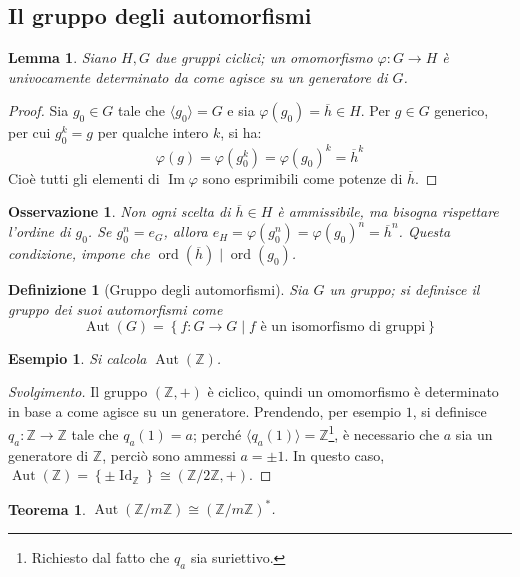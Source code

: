 \documentclass[11pt]{article}
\theoremstyle{style}
\newtheorem{esempio}{Esempio}[section]
\newtheorem{definizione}{Definizione}[section]
\newtheorem{teorema}{Teorema}[section]
\newtheorem{lemma}{Lemma}[teorema]
\newtheorem{osservazione}{Osservazione}[section]
\newenvironment{svolgimento}{\renewcommand\qedsymbol{$\blacksquare$}\begin{proof}[Svolgimento]}{\end{proof}}
\numberwithin{equation}{subsection}
\begin{document}
\subsection{Il gruppo degli automorfismi}
\begin{lemma}
	Siano $H,G$ due gruppi ciclici; un omomorfismo $\varphi : G \to H$ \`e univocamente determinato da come agisce su un generatore di $G$.
\end{lemma}
	\begin{proof}
		Sia $g_0\in G$ tale che $\langle g_0 \rangle = G$ e sia $\varphi (g_0) = \overline{h}\in H$.
		Per $g \in G$ generico, per cui $g_0^k = g$ per qualche intero $k$, si ha:
		\[
		\varphi (g) = \varphi (g_0^k) = \varphi (g_0)^k = \overline{h}^k
		\] 
		Cio\`e tutti gli elementi di $\operatorname{Im} \varphi $ sono esprimibili come potenze di $\overline{h}$.
	\end{proof}
\begin{osservazione}
Non ogni scelta di $\overline{h} \in H$ \`e ammissibile, ma bisogna rispettare l'ordine di $g_0$.
Se $g_0^n = e_G$, allora $e_H = \varphi (g_0^n) = \varphi (g_0)^n = \overline{h}^n$. Questa condizione, impone che $\operatorname{ord}(\overline{h})  \mid \operatorname{ord}(g_0) $.
\end{osservazione}
\begin{definizione}
	[Gruppo degli automorfismi]
	Sia $G$ un gruppo; si definisce il gruppo dei suoi automorfismi come
	\[
	\operatorname{Aut} (G) = \left\{ f: G \to G  \mid f \text{ \`e un isomorfismo di gruppi} \right\} 
	\] 
\end{definizione}
\begin{esempio}
	Si calcola $\operatorname{Aut} (\mathbb{Z})$. 
\end{esempio}
	\begin{svolgimento}
		Il gruppo $(\mathbb{Z},+)$ \`e ciclico, quindi un omomorfismo \`e determinato in base a come agisce su un generatore.
		Prendendo, per esempio $1$, si definisce $q_a :\mathbb{Z}\to \mathbb{Z} $ tale che $ q_a (1 ) = a$; perch\'e $\langle q_a(1) \rangle = \mathbb{Z}$\footnote{Richiesto dal fatto che $q_a$ sia suriettivo.}, \`e necessario che $a$ sia un generatore di $\mathbb{Z}$, perci\`o sono ammessi $a = \pm 1$. 
		In questo caso, $\operatorname{Aut} (\mathbb{Z})=\left\{ \pm \operatorname{Id} _{\mathbb{Z}}  \right\} \cong \left(\mathbb{Z} / 2\mathbb{Z}, +\right) $.
	\end{svolgimento}
\begin{teorema}
$\operatorname{Aut} (\mathbb{Z} / m \mathbb{Z}) \cong (\mathbb{Z} / m \mathbb{Z})^*$.
\end{teorema}
\end{document}
